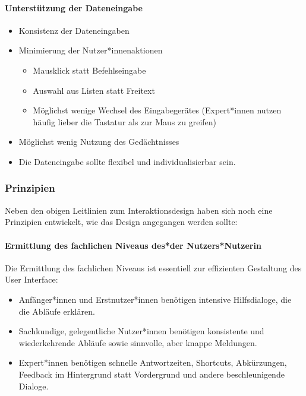 				\paragraph{Unterstützung der Dateneingabe}
					\begin{itemize}
						\item Konsistenz der Dateneingaben
						\item Minimierung der Nutzer*innenaktionen
							\begin{itemize}
								\item Mausklick statt Befehlseingabe
								\item Auswahl aus Listen statt Freitext
								\item Möglichst wenige Wechsel des Eingabegerätes (Expert*innen nutzen häufig lieber die Tastatur als zur Maus zu greifen)
							\end{itemize}
						\item Möglichst wenig Nutzung des Gedächtnisses
						\item Die Dateneingabe sollte flexibel und individualisierbar sein.
					\end{itemize}

			\subsubsection{Prinzipien}
				Neben den obigen Leitlinien zum Interaktionsdesign haben sich noch eine Prinzipien entwickelt, wie das Design angegangen werden sollte:

				\paragraph{Ermittlung des fachlichen Niveaus des*der Nutzers*Nutzerin}
					Die Ermittlung des fachlichen Niveaus ist essentiell zur effizienten Gestaltung des User Interface:
					\begin{itemize}
						\item Anfänger*innen und Erstnutzer*innen benötigen intensive Hilfsdialoge, die die Abläufe erklären.
						\item Sachkundige, gelegentliche Nutzer*innen benötigen konsistente und wiederkehrende Abläufe sowie sinnvolle, aber knappe Meldungen.
						\item Expert*innen benötigen schnelle Antwortzeiten, Shortcuts, Abkürzungen, Feedback im Hintergrund statt Vordergrund und andere beschleunigende Dialoge.
					\end{itemize}

